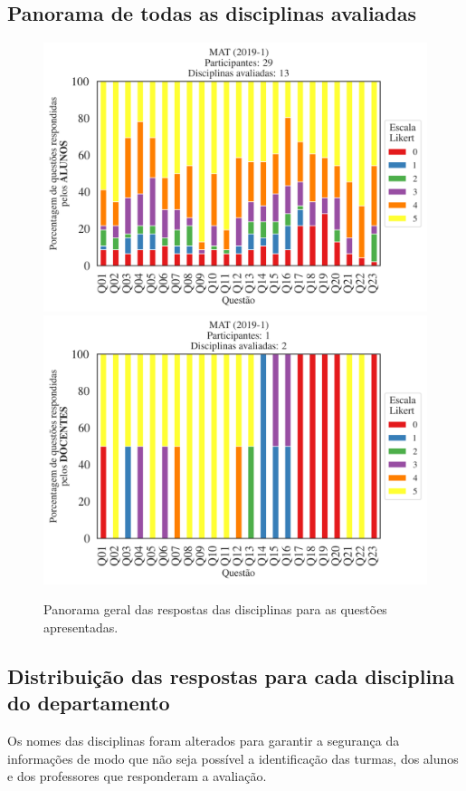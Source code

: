 \documentclass[a4paper,10pt]{article}
\begin{document}
\subsection{Panorama de todas as disciplinas avaliadas}
\begin{figure}[h]
\centering
\includegraphics[width=0.85\linewidth]{analise_geral_departamento_MAT_ALUNO_TURMA.png}
\includegraphics[width=0.85\linewidth]{analise_geral_departamento_MAT_DOCENTE_TURMA.png}
\caption{\label{fig:analise_geral_departamento}            Panorama geral das respostas das disciplinas para as questões apresentadas.}
\end{figure}
\subsection{Distribuição das respostas para cada disciplina do departamento}

Os nomes das disciplinas foram alterados para garantir a segurança da informações de modo que não seja possível a identificação das turmas, dos alunos  e dos professores que responderam a avaliação.
\end{document}
